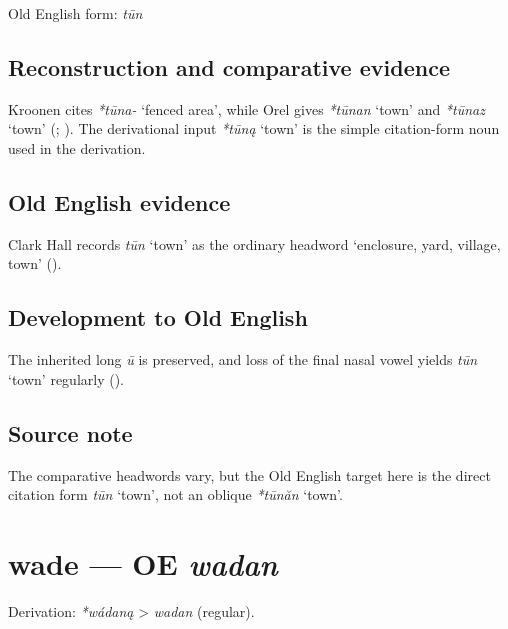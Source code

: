 \documentclass[
  british,
  a4paper,
  openany]{book}
\providecommand{\Recon}[1]{\emph{*#1}}
{\catcode`→=\active \global\def→{\ensuremath{\rightarrow}}}
\providecommand{\texorpdfstring}[2]{#1}
\providecommand{\Recon}[1]{\emph{*#1}}
{\catcode`→=\active \global\def→{\ensuremath{\rightarrow}}}
\begin{document}
Old English form: \emph{tūn}

\subsection{Reconstruction and comparative
evidence}\label{reconstruction-and-comparative-evidence-59}

Kroonen cites \emph{*tūna-} `fenced area', while Orel gives
\Recon{tūnan} `town' and \Recon{tūnaz} `town'
(; ). The derivational input \Recon{tūną} `town' is the simple
citation-form noun used in the derivation.

\subsection{Old English evidence}\label{old-english-evidence-59}

Clark Hall records \emph{tūn} `town' as the ordinary headword
`enclosure, yard, village, town' ().

\subsection{Development to Old
English}\label{development-to-old-english-59}

The inherited long \emph{ū} is preserved, and loss of the final nasal
vowel yields \emph{tūn} `town' regularly
().

\subsection{Source note}\label{source-note-6}

The comparative headwords vary, but the Old English target here is the
direct citation form \emph{tūn} `town', not an oblique \Recon{tūnăn}
`town'.

\section{\texorpdfstring{wade --- OE
\emph{wadan}}{wade --- OE wadan}}\label{wade-oe-wadan}


Derivation: \emph{*wádaną} \textgreater{} \emph{wadan} (regular).
\end{document}

